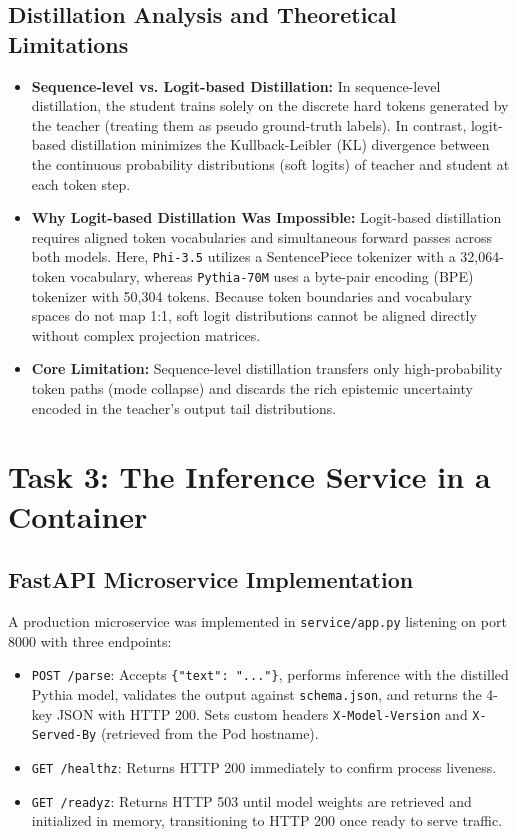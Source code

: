 \documentclass[10pt,a4paper]{article}
\begin{document}
\subsection{Distillation Analysis and Theoretical Limitations}
\begin{itemize}
    \item \textbf{Sequence-level vs. Logit-based Distillation:} In sequence-level distillation, the student trains solely on the discrete hard tokens generated by the teacher (treating them as pseudo ground-truth labels). In contrast, logit-based distillation minimizes the Kullback-Leibler (KL) divergence between the continuous probability distributions (soft logits) of teacher and student at each token step.
    \item \textbf{Why Logit-based Distillation Was Impossible:} Logit-based distillation requires aligned token vocabularies and simultaneous forward passes across both models. Here, \texttt{Phi-3.5} utilizes a SentencePiece tokenizer with a 32,064-token vocabulary, whereas \texttt{Pythia-70M} uses a byte-pair encoding (BPE) tokenizer with 50,304 tokens. Because token boundaries and vocabulary spaces do not map 1:1, soft logit distributions cannot be aligned directly without complex projection matrices.
    \item \textbf{Core Limitation:} Sequence-level distillation transfers only high-probability token paths (mode collapse) and discards the rich epistemic uncertainty encoded in the teacher's output tail distributions.
\end{itemize}

\section{Task 3: The Inference Service in a Container}
\subsection{FastAPI Microservice Implementation}
A production microservice was implemented in \texttt{service/app.py} listening on port 8000 with three endpoints:
\begin{itemize}
    \item \texttt{POST /parse}: Accepts \texttt{\{"text": "..."\}}, performs inference with the distilled Pythia model, validates the output against \texttt{schema.json}, and returns the 4-key JSON with HTTP 200. Sets custom headers \texttt{X-Model-Version} and \texttt{X-Served-By} (retrieved from the Pod hostname).
    \item \texttt{GET /healthz}: Returns HTTP 200 immediately to confirm process liveness.
    \item \texttt{GET /readyz}: Returns HTTP 503 until model weights are retrieved and initialized in memory, transitioning to HTTP 200 once ready to serve traffic.
\end{itemize}
\end{document}

